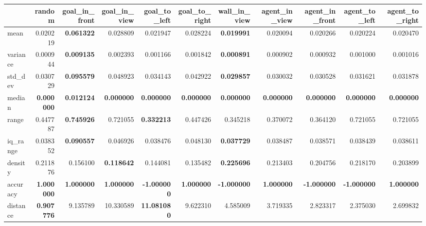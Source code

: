 \begin{tabular}{lrrrrrrrrrr}
\toprule
 & random & goal\_in\_front & goal\_in\_view & goal\_to\_left & goal\_to\_right & wall\_in\_view & agent\_in\_view & agent\_in\_front & agent\_to\_left & agent\_to\_right \\
\midrule
mean & 0.020219 & \color{f_green} \bfseries 0.061322 & 0.028809 & 0.021947 & 0.028224 & \color{f_darkred} \bfseries 0.019991 & 0.020094 & 0.020266 & 0.020224 & 0.020470 \\
variance & 0.000944 & \color{f_green} \bfseries 0.009135 & 0.002393 & 0.001166 & 0.001842 & \color{f_darkred} \bfseries 0.000891 & 0.000902 & 0.000932 & 0.001000 & 0.001016 \\
std\_dev & 0.030729 & \color{f_green} \bfseries 0.095579 & 0.048923 & 0.034143 & 0.042922 & \color{f_darkred} \bfseries 0.029857 & 0.030032 & 0.030528 & 0.031621 & 0.031878 \\
median & \color{f_darkred} \bfseries 0.000000 & \color{f_green} \bfseries 0.012124 & \color{f_darkred} \bfseries 0.000000 & \color{f_darkred} \bfseries 0.000000 & \color{f_darkred} \bfseries 0.000000 & \color{f_darkred} \bfseries 0.000000 & \color{f_darkred} \bfseries 0.000000 & \color{f_darkred} \bfseries 0.000000 & \color{f_darkred} \bfseries 0.000000 & \color{f_darkred} \bfseries 0.000000 \\
range & 0.447787 & \color{f_green} \bfseries 0.745926 & 0.721055 & \color{f_darkred} \bfseries 0.332213 & 0.447426 & 0.345218 & 0.370072 & 0.364120 & 0.721055 & 0.721055 \\
iq\_range & 0.038352 & \color{f_green} \bfseries 0.090557 & 0.046926 & 0.038476 & 0.048130 & \color{f_darkred} \bfseries 0.037729 & 0.038487 & 0.038571 & 0.038439 & 0.038611 \\
density & 0.211876 & 0.156100 & \color{f_darkred} \bfseries 0.118642 & 0.144081 & 0.135482 & \color{f_green} \bfseries 0.225696 & 0.213403 & 0.204756 & 0.218170 & 0.203899 \\
accuracy & \color{f_green} \bfseries 1.000000 & \color{f_green} \bfseries 1.000000 & \color{f_green} \bfseries 1.000000 & \color{f_darkred} \bfseries -1.000000 & \color{f_green} \bfseries 1.000000 & \color{f_darkred} \bfseries -1.000000 & \color{f_green} \bfseries 1.000000 & \color{f_darkred} \bfseries -1.000000 & \color{f_darkred} \bfseries -1.000000 & \color{f_green} \bfseries 1.000000 \\
distance & \color{f_darkred} \bfseries 0.907776 & 9.135789 & 10.330589 & \color{f_green} \bfseries 11.081080 & 9.622310 & 4.585009 & 3.719335 & 2.823317 & 2.375030 & 2.699832 \\
\bottomrule
\end{tabular}